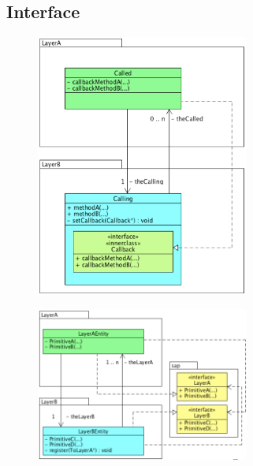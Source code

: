 \documentclass[resume]{subfiles}
\begin{document}
\subsection{Interface}
\begin{figure}[H]
\centering
\includegraphics[width=7.00cm]{img_6.png}
\end{figure}
\begin{figure}[H]
\centering
\includegraphics[width=7.00cm]{img_7.png}
\end{figure}
\end{document}

